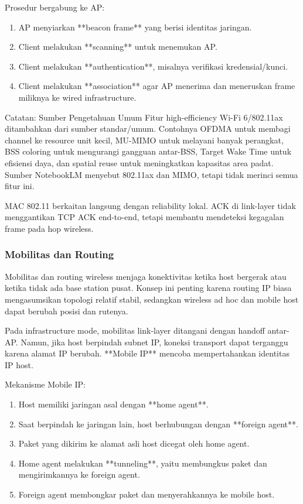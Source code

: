Prosedur bergabung ke AP:
\begin{enumerate}
    \item AP menyiarkan **beacon frame** yang berisi identitas jaringan.
    \item Client melakukan **scanning** untuk menemukan AP.
    \item Client melakukan **authentication**, misalnya verifikasi kredensial/kunci.
    \item Client melakukan **association** agar AP menerima dan meneruskan frame miliknya ke wired infrastructure.
\end{enumerate}

\begin{cmt}{Catatan: Sumber Pengetahuan Umum}{}
Fitur high-efficiency Wi-Fi 6/802.11ax ditambahkan dari sumber standar/umum. Contohnya OFDMA untuk membagi channel ke resource unit kecil, MU-MIMO untuk melayani banyak perangkat, BSS coloring untuk mengurangi gangguan antar-BSS, Target Wake Time untuk efisiensi daya, dan spatial reuse untuk meningkatkan kapasitas area padat. Sumber NotebookLM menyebut 802.11ax dan MIMO, tetapi tidak merinci semua fitur ini.
\end{cmt}

MAC 802.11 berkaitan langsung dengan reliability lokal. ACK di link-layer tidak menggantikan TCP ACK end-to-end, tetapi membantu mendeteksi kegagalan frame pada hop wireless.

\subsubsection{Mobilitas dan Routing}
\begin{jawab}
Mobilitas dan routing wireless menjaga konektivitas ketika host bergerak atau ketika tidak ada base station pusat. Konsep ini penting karena routing IP biasa mengasumsikan topologi relatif stabil, sedangkan wireless ad hoc dan mobile host dapat berubah posisi dan rutenya.
\end{jawab}

Pada infrastructure mode, mobilitas link-layer ditangani dengan handoff antar-AP. Namun, jika host berpindah subnet IP, koneksi transport dapat terganggu karena alamat IP berubah. **Mobile IP** mencoba mempertahankan identitas IP host.

Mekanisme Mobile IP:
\begin{enumerate}
    \item Host memiliki jaringan asal dengan **home agent**.
    \item Saat berpindah ke jaringan lain, host berhubungan dengan **foreign agent**.
    \item Paket yang dikirim ke alamat asli host dicegat oleh home agent.
    \item Home agent melakukan **tunneling**, yaitu membungkus paket dan mengirimkannya ke foreign agent.
    \item Foreign agent membongkar paket dan menyerahkannya ke mobile host.
\end{enumerate}

